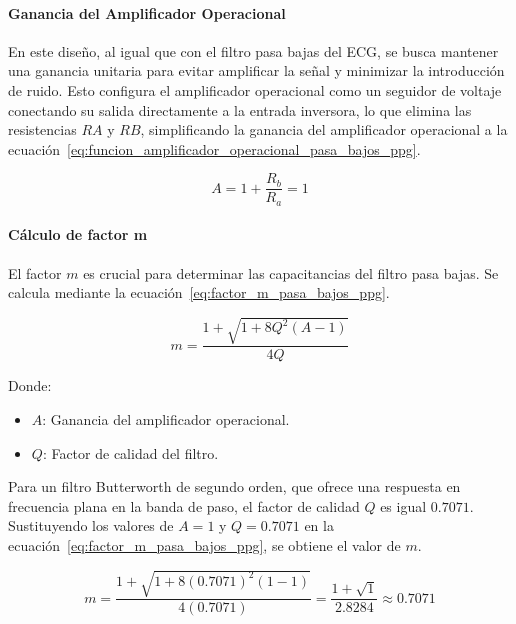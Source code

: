         \paragraph{Ganancia del Amplificador Operacional}
        En este diseño, al igual que con el filtro pasa bajas del ECG, se busca mantener una ganancia unitaria para evitar amplificar la señal y minimizar la introducción de ruido. Esto configura el amplificador operacional como un seguidor de voltaje conectando su salida directamente a la entrada inversora, lo que elimina las resistencias $RA$ y $RB$, simplificando la ganancia del amplificador operacional a la ecuación~\ref{eq:funcion_amplificador_operacional_pasa_bajos_ppg}.

        \begin{equation}
            \label{eq:funcion_amplificador_operacional_pasa_bajos_ppg}
            A = 1 + \frac{R_b}{R_a} = 1
        \end{equation}

        \paragraph{Cálculo de factor m}
        El factor $m$ es crucial para determinar las capacitancias del filtro pasa bajas. Se calcula mediante la ecuación~\ref{eq:factor_m_pasa_bajos_ppg}.

        \begin{equation}
            \label{eq:factor_m_pasa_bajos_ppg}
            m = \frac{1+\sqrt{1+8Q^2(A-1)}}{4Q}
        \end{equation}

        Donde:

        \begin{itemize}
            \item $A$: Ganancia del amplificador operacional.
            \item $Q$: Factor de calidad del filtro.
        \end{itemize}

        Para un filtro Butterworth de segundo orden, que ofrece una respuesta en frecuencia plana en la banda de paso, el factor de calidad $Q$ es igual $0.7071$. Sustituyendo los valores de $A = 1$ y $Q = 0.7071$ en la ecuación~\ref{eq:factor_m_pasa_bajos_ppg}, se obtiene el valor de $m$.

        \begin{equation}
            \label{eq:factor_m_pasa_bajos_ppg_valor}
            m = \frac{1+\sqrt{1+8(0.7071)^2(1-1)}}{4(0.7071)} = \frac{1 + \sqrt{1}}{2.8284}\approx 0.7071
        \end{equation}

